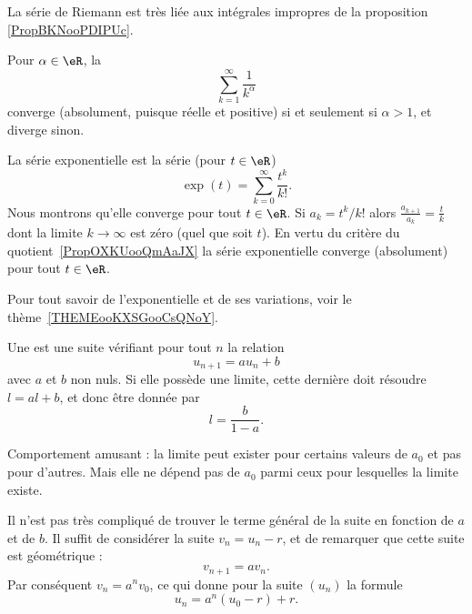 La série de Riemann est très liée aux intégrales impropres de la proposition \ref{PropBKNooPDIPUc}.
\begin{proposition} \label{PROPooFPVZooGnsqrs}      \label{EXooCTYNooCjYQvJ}
	Pour \( \alpha \in \eR\), la 
	\begin{equation}        \label{EqSerRiem}
		\sum_{k=1}^\infty \frac{ 1 }{ k^{\alpha}}
	\end{equation}
	converge (absolument, puisque réelle et positive) si et seulement si \( \alpha > 1\), et diverge sinon.
\end{proposition}

\begin{example} \label{ExIJMHooOEUKfj}
	La série exponentielle est la série (pour \( t\in \eR\))
	\begin{equation}
		\exp(t)=\sum_{k=0}^{\infty}\frac{ t^k }{ k! }.
	\end{equation}
	Nous montrons qu'elle converge pour tout \( t\in \eR\). Si \( a_k=t^k/k!\) alors \( \frac{ a_{k+1} }{ a_k }=\frac{ t }{ k }\) dont la limite \( k\to \infty\) est zéro (quel que soit \( t\)). En vertu du critère du quotient~\ref{PropOXKUooQmAaJX} la série exponentielle converge (absolument) pour tout \( t\in \eR\).

	Pour tout savoir de l'exponentielle et de ses variations, voir le thème~\ref{THEMEooKXSGooCsQNoY}.
\end{example}

\begin{example}
	Une  est une suite vérifiant pour tout \( n\) la relation
	\begin{equation}
		u_{n+1}=au_n+b
	\end{equation}
	avec \( a\) et \( b\) non nuls. Si elle possède une limite, cette dernière doit résoudre \( l=al+b\), et donc être donnée par
	\begin{equation}
		l=\frac{ b }{ 1-a }.
	\end{equation}

	Comportement amusant : la limite peut exister pour certains valeurs de \( a_0\) et pas pour d'autres. Mais elle ne dépend pas de \( a_0\) parmi ceux pour lesquelles la limite existe.

	Il n'est pas très compliqué de trouver le terme général de la suite en fonction de \( a\) et de \( b\). Il suffit de considérer la suite \( v_n=u_n-r\), et de remarquer que cette suite est géométrique :
	\begin{equation}
		v_{n+1}=av_n.
	\end{equation}
	Par conséquent \( v_n=a^nv_0\), ce qui donne pour la suite \( (u_n)\) la formule
	\begin{equation}
		u_n=a^n(u_0-r)+r.
	\end{equation}
\end{example}


